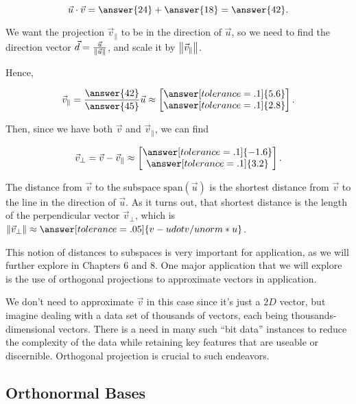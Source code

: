 \documentclass{ximera}
\begin{document}
\begin{exploration}
\begin{example}
      $$\vec{u}\cdot\vec{v}=\answer{24}+\answer{18}=\answer{42}.$$

      We want the projection $\vec{v}_\parallel$ to be in the direction of $\vec{u}$, so we need to find the direction vector $\vec{d}=\frac{\vec{u}}{\left\|\vec{u}\right\|}$, and scale it by $\left\|\vec{v}_\parallel\right\|$.

      Hence, 

      $$\vec{v}_\parallel=\frac{\answer{42}}{\answer{45}}\vec{u}\approx\begin{bmatrix}
         \answer[tolerance=.1]{5.6}\\\answer[tolerance=.1]{2.8}
      \end{bmatrix}.$$

      Then, since we have both $\vec{v}$ and $\vec{v}_\parallel$, we can find 
      
      $$\vec{v}_\perp=\vec{v}-\vec{v}_\parallel\approx \begin{bmatrix}
         \answer[tolerance=.1]{-1.6}\\\answer[tolerance=.1]{3.2}
      \end{bmatrix}.$$

      The distance from $\vec{v}$ to the subspace $\mbox{span}(\vec{u})$ is the shortest distance from $\vec{v}$ to the line in the direction of $\vec{u}$. As it turns out, that shortest distance is the length of the perpendicular vector $\vec{v}_\perp$, which is $\norm{\vec{v}_\perp}\approx\answer[tolerance=.05]{v-udotv/unorm*u}$.
      
      \end{example}

   This notion of distances to subspaces is very important for application, as we will further explore in Chapters 6 and 8. One major application that we will explore is the use of orthogonal projections to approximate vectors in application. 

   We don't need to approximate $\vec{v}$ in this case since it's just a $2D$ vector, but imagine dealing with a data set of thousands of vectors, each being thousands-dimensional vectors. There is a need in many such ``bit data'' instances to reduce the complexity of the data while retaining key features that are useable or discernible. Orthogonal projection is crucial to such endeavors.


\end{exploration}

\subsection*{Orthonormal Bases}
\end{document}
